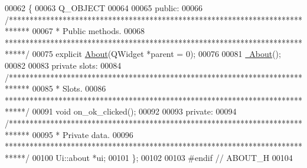 \begin{DoxyCode}
00062 \{
00063   Q\_OBJECT
00064 
00065 \textcolor{keyword}{public}:
00066   \textcolor{comment}{/*****************************************************************************}
00067 \textcolor{comment}{  * Public methods.}
00068 \textcolor{comment}{  *****************************************************************************/}
00075   \textcolor{keyword}{explicit} \hyperlink{group___window_gab79599ebbcdeffe0a96e00f010e64177}{About}(QWidget *parent = 0);
00076 
00081   \hyperlink{group___window_gace60197b1b610998908036ee1f802204}{~About}();
00082 
00083 \textcolor{keyword}{private} slots:
00084   \textcolor{comment}{/*****************************************************************************}
00085 \textcolor{comment}{  * Slots.}
00086 \textcolor{comment}{  *****************************************************************************/}
00091   \textcolor{keywordtype}{void} on\_ok\_clicked();
00092 
00093 \textcolor{keyword}{private}:
00094   \textcolor{comment}{/*****************************************************************************}
00095 \textcolor{comment}{  * Private data.}
00096 \textcolor{comment}{  *****************************************************************************/}
00100   Ui::about *ui;
00101 \};
00102 
00103 \textcolor{preprocessor}{#endif // ABOUT\_H}
00104 
\end{DoxyCode}
